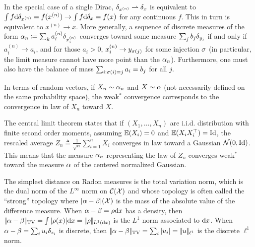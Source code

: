 \begin{rem}\label{rem-weak-conv-disc}
In the special case of a single Dirac, $\delta_{x^{(n)}} \rightharpoonup \delta_x$ is equivalent to $\int f \mathrm{d}\delta_{x^{(n)}} = f(x^{(n)}) \rightarrow \int f \mathrm{d}\delta_{x} = f(x)$ for any continuous $f$. This in turn is equivalent to $x^{(n)} \rightarrow x$. More generally, a sequence of discrete measures of the form $\alpha_n \coloneqq \sum_k a_i^{(n)} \delta_{ x_i^{(n)} }$ converges toward some measure $\sum_j b_j \delta_{y_j}$ if and only if $a_i^{(n)} \rightarrow a_i$, and for those $a_i>0$, $x_i^{(n)} \rightarrow y_{\sigma(j)}$ for some injection $\sigma$ (in particular, the limit measure cannot have more point than the $\alpha_n$). Furthermore, one must also have the balance of mass $\sum_{i : \sigma(i)=j} a_i = b_j$ for all $j$.

\end{rem}

In terms of random vectors, if $X_n \sim \alpha_n$ and $X \sim \alpha$ (not necessarily defined on the same probability space), the weak$^*$ convergence corresponds to the convergence in law of $X_n$ toward $X$.

\begin{rem}\label{rem-clt}
	The central limit theorem states that if $(X_1,\ldots,X_n)$ are i.i.d. distribution with finite second order moments, assuming $\mathbb{E}(X_i)=0$ and $\mathbb{E}(X_i X_i^\top)=\mathrm{Id}$, the rescaled average $Z_n \triangleq \frac{1}{\sqrt{n}} \sum_{i=1}^n X_i$ converges in law toward a Gaussian $\mathcal{N}(0,\mathrm{Id})$. This means that the measure $\alpha_n$ representing the law of $Z_n$ converges weak$^*$ toward the measure $\alpha$ of the centered normalized Gaussian.
\end{rem}

\begin{defn}
The simplest distance on Radon measures is the total variation norm, which is the dual norm of the $L^\infty$ norm on $\mathcal{C}(\mathcal{X})$ and whose topology is often called the ``strong'' topology
where $|\alpha-\beta|(\mathcal{X})$ is the mass of the absolute value of the difference measure. When $\alpha-\beta=\rho \mathrm{d} x$ has a density, then $|\!| \alpha-\beta |\!|_{\operatorname{TV}}=\int |\rho(x)| \mathrm{d} x=|\!| \rho |\!|_{L^1(\mathrm{d} x)}$ is the $L^1$ norm associated to $\mathrm{d} x$. When $\alpha-\beta=\sum_i u_i \delta_{z_i}$ is discrete, then $|\!| \alpha-\beta |\!|_{\operatorname{TV}}=\sum_i |u_i|=|\!| u |\!|_{\ell^1}$ is the discrete $\ell^1$ norm. 
\end{defn}

